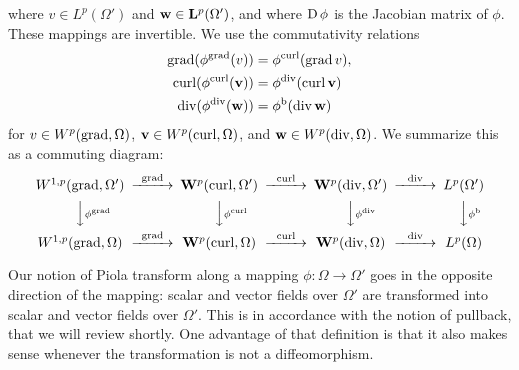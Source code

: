 \documentclass[a4paper]{article}
\begin{document}
where $v \in L^{p}(\Omega')$ and ${\mathbf w} \in {\mathbf L}^{p}(\Omega')$, 
and where $\operatorname{D}\phi$ is the Jacobian matrix of $\phi$. 
These mappings are invertible. 
%
%
We use the commutativity relations 
\begin{subequations}\label{eq_piola_commute}
\begin{align}
    \operatorname{grad} (\phi^{\operatorname{grad}} (v)) &= \phi^{\operatorname{curl}}(\operatorname{grad} v), 
    \\
    \operatorname{curl} (\phi^{\operatorname{curl}}({\mathbf v})) &= \phi^{\operatorname{div}}(\operatorname{curl} {\mathbf v}) 
    \\
    \operatorname{div} (\phi^{\operatorname{div}}({\mathbf w})) &= \phi^{\rm b}(\operatorname{div} {\mathbf w})
\end{align}
\end{subequations}
for $v \in W^{p}(\operatorname{grad},\Omega)$, ${\mathbf v} \in W^{p}(\operatorname{curl},\Omega)$, and ${\mathbf w} \in W^{p}(\operatorname{div},\Omega)$.  
We summarize this as a commuting diagram:
\begin{align*}
    \begin{CD}
        W^{1,p}(\grad,\Omega') @>{\grad}>> \bfW^{p}(\curl,\Omega') @>{\curl}>> \bfW^{p}(\divergence,\Omega') @>{\divergence}>> L^{p}(\Omega')
        \\
        @VV{\phi^{\grad}}V 
        @VV{\phi^{\curl}}V 
        @VV{\phi^{\divergence}}V 
        @VV{\phi^{\rm b}}V 
        \\
        W^{1,p}(\grad,\Omega ) @>{\grad}>> \bfW^{p}(\curl,\Omega ) @>{\curl}>> \bfW^{p}(\divergence,\Omega ) @>{\divergence}>> L^{p}(\Omega )
    \end{CD}
\end{align*}

\begin{remark}
    Our notion of Piola transform along a mapping $\phi : \Omega \rightarrow \Omega'$ goes in the opposite direction of the mapping:
    scalar and vector fields over $\Omega'$ are transformed into scalar and vector fields over $\Omega'$.
    This is in accordance with the notion of pullback, that we will review shortly. 
    One advantage of that definition is that it also makes sense whenever the transformation is not a diffeomorphism. 
\end{remark}

%

%
%


\end{document}
